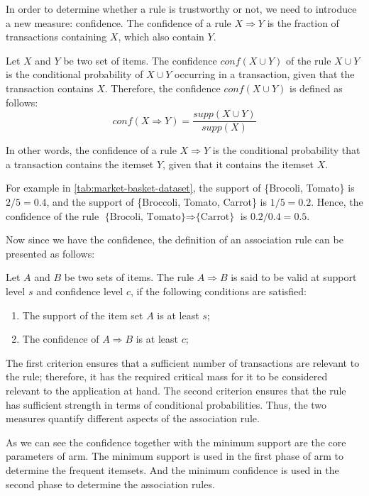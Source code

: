 In order to determine whether a rule is trustworthy or not, we need to introduce a new measure: confidence.
The confidence of a rule $X \Rightarrow Y$ is the fraction of transactions containing $X$, which also contain $Y$.
\begin{definition}
    Let $X$ and $Y$ be two set of items.
    The confidence $conf(X \cup Y)$ of the rule $X \cup Y$ is the conditional probability of $X \cup Y$ occurring in a transaction, given that the transaction contains $X$.
    Therefore, the confidence $conf(X \cup Y)$ is defined as follows:
    \begin{equation}
        conf(X \Rightarrow Y) = \frac{supp(X \cup Y)}{supp(X)}
    \end{equation}
\end{definition}
In other words, the confidence of a rule $X \Rightarrow Y$ is the conditional probability that a transaction contains the itemset $Y$, given that it contains the itemset $X$.

For example in \autoref{tab:market-basket-dataset}, the support of \{Brocoli, Tomato\} is $2/5=0.4$, and the support of \{Broccoli, Tomato, Carrot\} is $1/5=0.2$.
Hence, the confidence of the rule $\text{\{Brocoli, Tomato\}} \Rightarrow \text{\{Carrot\}}$ is $0.2 / 0.4 = 0.5$.

Now since we have the confidence, the definition of an association rule can be presented as follows:
\begin{definition}
    Let $A$ and $B$ be two sets of items.
    The rule $A \Rightarrow B$ is said to be valid at support level $s$ and confidence level $c$, if the following conditions are satisfied:
    \begin{enumerate}
        \item The support of the item set $A$ is at least $s$;
        \item The confidence of $A \Rightarrow B$ is at least $c$;
    \end{enumerate}
    The first criterion ensures that a sufficient number of transactions are relevant to the rule; therefore, it has the required critical mass for it to be considered relevant to the application at hand.
    The second criterion ensures that the rule has sufficient strength in terms of conditional probabilities.
    Thus, the two measures quantify different aspects of the association rule.
\end{definition}
As we can see the confidence together with the minimum support are the core parameters of \acl{arm}.
The minimum support is used in the first phase of \acl{arm} to determine the frequent itemsets.
And the minimum confidence is used in the second phase to determine the association rules.

